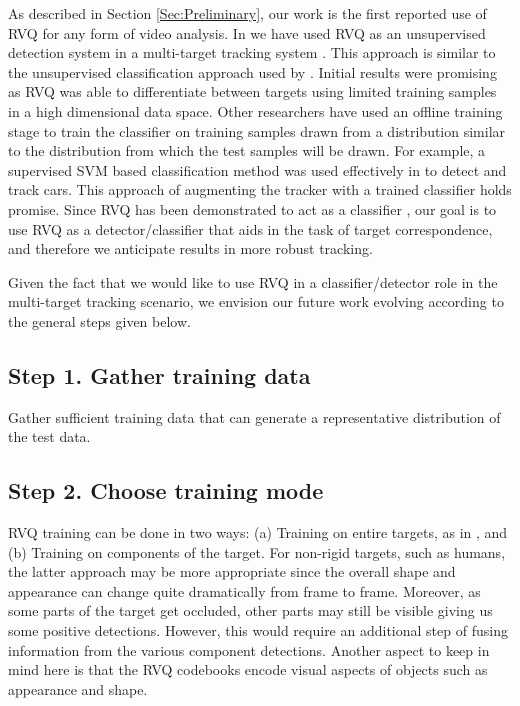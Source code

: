 \documentclass[12pt,letterpaper,doublespaced,ETD,proposal]{gt-ece-thesis}
\begin{document}
\begin{Body}
As described in Section \ref{Sec:Preliminary}, our work \cite{2010_CNF_TrkRVQ_Aslam, 2010_CNF_HMMRVQ_Aslam} is the first reported use of RVQ for any form of video analysis.  In \cite{2010_CNF_TrkRVQ_Aslam} we have used RVQ as an unsupervised detection system in a multi-target tracking system \cite{2010_CNF_TrkRVQ_Aslam}.  This approach is similar to the unsupervised classification approach used by \cite{1998_CNF_Tracking_Lipton}.  Initial results were promising as RVQ was able to differentiate between targets using limited training samples in a high dimensional data space.  Other researchers have used an offline training stage to train the classifier on training samples drawn from a distribution similar to the distribution from which the test samples will be drawn.  For example, a supervised SVM based classification method was used effectively in \cite{2004_JNL_SVMtracking_Avidan} to detect and track cars.  This approach of augmenting the tracker with a trained classifier holds promise.  Since RVQ has been demonstrated to act as a classifier \cite{2007_JNL_IDDM_Barnes}, our goal is to use RVQ as a detector/classifier that aids in the task of target correspondence, and therefore we anticipate results in more robust tracking.  

Given the fact that we would like to use RVQ in a classifier/detector role in the multi-target tracking scenario, we envision our future work evolving according to the general steps given below. 

\subsection{Step 1. Gather training data}
Gather sufficient training data that can generate a representative distribution of the test data.  

\subsection{Step 2. Choose training mode}
RVQ training can be done in two ways: (a) Training on entire targets, as in \cite{2010_CNF_HMMRVQ_Aslam, 2010_CNF_TrkRVQ_Aslam}, and  (b) Training on components of the target.  For non-rigid targets, such as humans, the latter approach may be more appropriate since the overall shape and appearance can change quite dramatically from frame to frame.  Moreover, as some parts of the target get occluded, other parts may still be visible giving us some positive detections.  However, this would require an additional step of fusing information from the various component detections.  Another aspect to keep in mind here is that the RVQ codebooks encode visual aspects of objects such as appearance and shape.


\end{Body}
\end{document}
